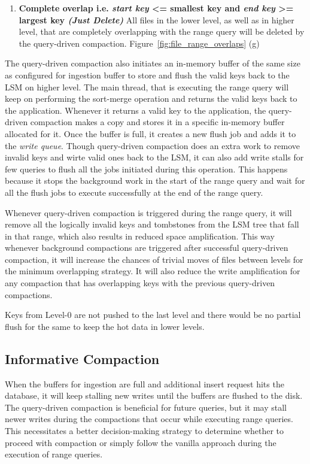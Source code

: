 \begin{enumerate}
    \item \textbf{Complete overlap i.e. \textit{start key} <= smallest key and \textit{end key} >= largest key 
    \textit{(Just Delete)}} All files in the lower level, as well as in higher level, that are completely overlapping 
    with the range query will be deleted by the query-driven compaction. Figure~\ref{fig:file_range_overlaps} (g)
\end{enumerate}
The query-driven compaction also initiates an in-memory buffer of the same size as configured for ingestion buffer to store
and flush the valid keys back to the LSM on higher level. The main thread, that is executing the range 
query will keep on performing the sort-merge operation and returns the valid keys back to the application. Whenever it 
returns a valid key to the application, the query-driven compaction makes a copy and stores it in a specific in-memory 
buffer allocated for it. Once the buffer is full, it creates a new flush job and adds it to the \textit{write queue}. 
Though query-driven compaction does an extra work to remove invalid keys and wirte valid ones back to the LSM, it can 
also add write stalls for few queries to flush all the jobs initiated during this 
operation. This happens because it stops the background work in the start of the range query and wait for all the flush 
jobs to execute successfully at the end of the range query.

Whenever query-driven compaction is triggered during the range query, it will remove all the logically invalid keys and 
tombstones from the LSM tree that fall in that range, which also results in reduced space amplification. This way 
whenever background compactions are triggered after successful query-driven compaction, it will increase the chances of 
trivial moves of files between levels for the minimum overlapping strategy. It will also reduce the write 
amplification for any compaction that has overlapping keys with the previous query-driven compactions.

Keys from Level-0 are not pushed to the last level and there would be no partial flush for the same to 
keep the hot data in lower levels.

\subsection{Informative Compaction}
When the buffers for ingestion are full and additional insert request hits the database, it will keep stalling 
new writes until the buffers are flushed to the disk. The query-driven compaction is beneficial for future queries, but 
it may stall newer writes during the compactions that occur while executing range queries. This necessitates a better 
decision-making strategy to determine whether to proceed with compaction or simply follow the vanilla approach during the 
execution of range queries.

